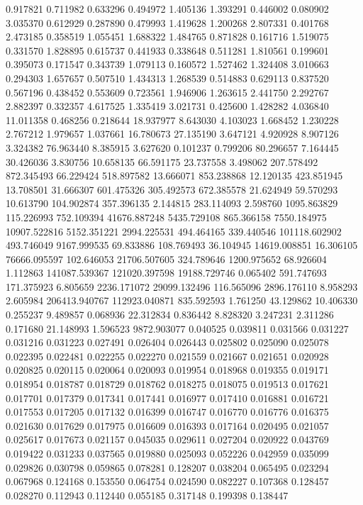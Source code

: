 0.917821
0.711982
0.633296
0.494972
1.405136
1.393291
0.446002
0.080902
3.035370
0.612929
0.287890
0.479993
1.419628
1.200268
2.807331
0.401768
2.473185
0.358519
1.055451
1.688322
1.484765
0.871828
0.161716
1.519075
0.331570
1.828895
0.615737
0.441933
0.338648
0.511281
1.810561
0.199601
0.395073
0.171547
0.343739
1.079113
0.160572
1.527462
1.324408
3.010663
0.294303
1.657657
0.507510
1.434313
1.268539
0.514883
0.629113
0.837520
0.567196
0.438452
0.553609
0.723561
1.946906
1.263615
2.441750
2.292767
2.882397
0.332357
4.617525
1.335419
3.021731
0.425600
1.428282
4.036840
11.011358
0.468256
0.218644
18.937977
8.643030
4.103023
1.668452
1.230228
2.767212
1.979657
1.037661
16.780673
27.135190
3.647121
4.920928
8.907126
3.324382
76.963440
8.385915
3.627620
0.101237
0.799206
80.296657
7.164445
30.426036
3.830756
10.658135
66.591175
23.737558
3.498062
207.578492
872.345493
66.229424
518.897582
13.666071
853.238868
12.120135
423.851945
13.708501
31.666307
601.475326
305.492573
672.385578
21.624949
59.570293
10.613790
104.902874
357.396135
2.144815
283.114093
2.598760
1095.863829
115.226993
752.109394
41676.887248
5435.729108
865.366158
7550.184975
10907.522816
5152.351221
2994.225531
494.464165
339.440546
101118.602902
493.746049
9167.999535
69.833886
108.769493
36.104945
14619.008851
16.306105
76666.095597
102.646053
21706.507605
324.789646
1200.975652
68.926604
1.112863
141087.539367
121020.397598
19188.729746
0.065402
591.747693
171.375923
6.805659
2236.171072
29099.132496
116.565096
2896.176110
8.958293
2.605984
206413.940767
112923.040871
835.592593
1.761250
43.129862
10.406330
0.255237
9.489857
0.068936
22.312834
0.836442
8.828320
3.247231
2.311286
0.171680
21.148993
1.596523
9872.903077
0.040525
0.039811
0.031566
0.031227
0.031216
0.031223
0.027491
0.026404
0.026443
0.025802
0.025090
0.025078
0.022395
0.022481
0.022255
0.022270
0.021559
0.021667
0.021651
0.020928
0.020825
0.020115
0.020064
0.020093
0.019954
0.018968
0.019355
0.019171
0.018954
0.018787
0.018729
0.018762
0.018275
0.018075
0.019513
0.017621
0.017701
0.017379
0.017341
0.017441
0.016977
0.017410
0.016881
0.016721
0.017553
0.017205
0.017132
0.016399
0.016747
0.016770
0.016776
0.016375
0.021630
0.017629
0.017975
0.016609
0.016393
0.017164
0.020495
0.021057
0.025617
0.017673
0.021157
0.045035
0.029611
0.027204
0.020922
0.043769
0.019422
0.031233
0.037565
0.019880
0.025093
0.052226
0.042959
0.035099
0.029826
0.030798
0.059865
0.078281
0.128207
0.038204
0.065495
0.023294
0.067968
0.124168
0.153550
0.064754
0.024590
0.082227
0.107368
0.128457
0.028270
0.112943
0.112440
0.055185
0.317148
0.199398
0.138447
